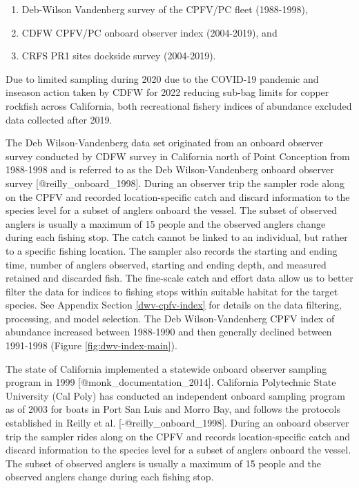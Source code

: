 \documentclass[11pt,
  letterpaper,
]{article}
\begin{document}
\begin{enumerate}

\item Deb-Wilson Vandenberg survey of the CPFV/PC fleet (1988-1998),
\item CDFW CPFV/PC onboard observer index (2004-2019), and
\item CRFS PR1 sites dockside survey (2004-2019).

\end{enumerate}

Due to limited sampling during 2020 due to the COVID-19 pandemic and inseason action taken by CDFW for 2022 reducing sub-bag limits for copper rockfish across California, both recreational fishery indices of abundance excluded data collected after 2019.

The Deb Wilson-Vandenberg data set originated from an onboard observer survey conducted by CDFW survey in California north of Point Conception from 1988-1998 and is referred to as the Deb Wilson-Vandenberg onboard observer survey {[}@reilly\_onboard\_1998{]}. During an observer trip the sampler rode along on the CPFV and recorded location-specific catch and discard information to the species level for a subset of anglers onboard the vessel. The subset of observed anglers is usually a maximum of 15 people and the observed anglers change during each fishing stop. The catch cannot be linked to an individual, but rather to a specific fishing location. The sampler also records the starting and ending time, number of anglers observed, starting and ending depth, and measured retained and discarded fish. The fine-scale catch and effort data allow us to better filter the data for indices to fishing stops within suitable habitat for the target species. See Appendix Section \ref{dwv-cpfv-index} for details on the data filtering, processing, and model selection. The Deb Wilson-Vandenberg CPFV index of abundance increased between 1988-1990 and then generally declined between 1991-1998 (Figure \ref{fig:dwv-index-main}).

The state of California implemented a statewide onboard observer sampling program in 1999 {[}@monk\_documentation\_2014{]}. California Polytechnic State University (Cal Poly) has conducted an independent onboard sampling program as of 2003 for boats in Port San Luis and Morro Bay, and follows the protocols established in Reilly et al. {[}-@reilly\_onboard\_1998{]}. During an onboard observer trip the sampler rides along on the CPFV and records location-specific catch and discard information to the species level for a subset of anglers onboard the vessel. The subset of observed anglers is usually a maximum of 15 people and the observed anglers change during each fishing stop.
\end{document}
